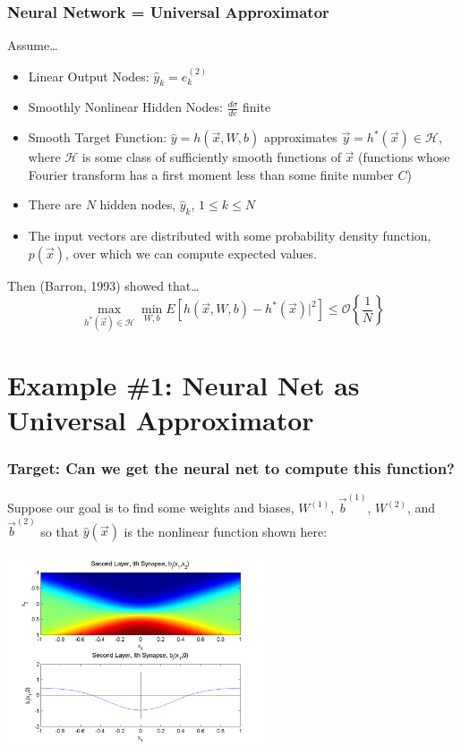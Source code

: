 \documentclass{beamer}
\begin{document}
\begin{frame}
  \frametitle{Neural Network = Universal Approximator}
  Assume\ldots
  \begin{itemize}
  \item Linear Output Nodes: $\hat{y}_k=e_k^{(2)}$
  \item Smoothly Nonlinear Hidden Nodes: $\frac{d\sigma}{de}$ finite
  \item Smooth Target Function: $\hat{y}=h(\vec{x},W,b)$ approximates
    $\vec{y}=h^*(\vec{x})\in{\mathcal H}$, where ${\mathcal H}$ is
    some class of sufficiently smooth functions of $\vec{x}$
    (functions whose Fourier transform has a first moment less than
    some finite number $C$)
    \item There are $N$ hidden nodes, $\hat{y}_k$, $1\le k\le N$
    \item The input vectors are distributed with some probability
      density function, $p(\vec{x})$, over which we can compute
      expected values.
  \end{itemize}
  Then (Barron, 1993) showed that\ldots
  \[
  \max_{h^*(\vec{x})\in{\mathcal H}}
    \min_{W,b} E\left[h(\vec{x},W,b)-h^*(\vec{x})\vert^2\right]
    \le {\mathcal O}\left\{\frac{1}{N}\right\}
    \]
\end{frame}

\section[Example \#1]{Example \#1: Neural Net as Universal Approximator}
\setcounter{subsection}{1}

\begin{frame}
  \frametitle{Target: Can we get the neural net to compute this
    function?}  Suppose our goal is to find some weights and biases,
  $W^{(1)}$, $\vec{b}^{(1)}$, $W^{(2)}$, and $\vec{b}^{(2)}$ so that
  $\hat{y}(\vec{x})$ is the nonlinear function shown here:
  \centerline{\includegraphics[width=3in]{figs/nn_synapse2.png}}
\end{frame}
\end{document}

